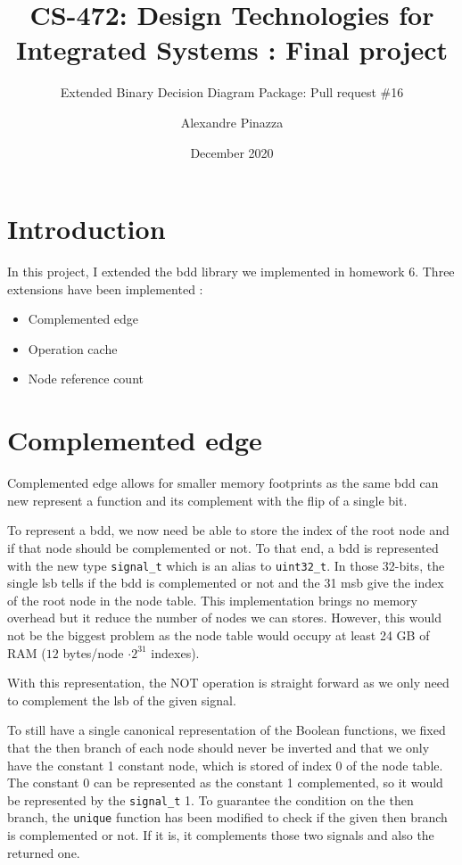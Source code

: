 \documentclass[nonacm=true]{acmart}
\title{CS-472: Design Technologies for Integrated Systems : Final project}
\subtitle{Extended Binary Decision Diagram Package: Pull request \#16}
\author{Alexandre Pinazza}
\affiliation{
    \institution{IC, EPFL}
    \state{Vaud}
    \city{Lausanne}
    \country{Switzerland}
}
\date{December 2020}
\newcommand{\inlineC}[1]{\texttt{#1}}
\begin{document}
\maketitle

\section{Introduction}
In this project, I extended the \acrfull{bdd} library we implemented in homework 6. Three extensions have been implemented :
\begin{itemize}
    \item Complemented edge
    \item Operation cache
    \item Node reference count
\end{itemize}

\section{Complemented edge}
Complemented edge allows for smaller memory footprints as the same \acrshort{bdd} can new represent a function and its complement with the flip of a single bit.

To represent a \acrshort{bdd}, we now need be able to store the index of the root node and if that node should be complemented or not. To that end, a \acrshort{bdd} is represented with the new type \inlineC{signal_t} which is an alias to \inlineC{uint32_t}. In those 32-bits, the single \acrfull{lsb} tells if the \acrshort{bdd} is complemented or not and the 31 \acrfull{msb} give the index of the root node in the node table. This implementation brings no memory overhead but it reduce the number of nodes we can stores. However, this would not be the biggest problem as the node table would occupy at least 24 GB of RAM ($12$ bytes/node $\cdot 2^{31}$ indexes).

With this representation, the NOT operation is straight forward as we only need to complement the \acrshort{lsb} of the given signal.

To still have a single canonical representation of the Boolean functions, we fixed that the then branch of each node should never be inverted and that we only have the constant 1 constant node, which is stored of index 0 of the node table. The constant 0 can be represented as the constant 1 complemented, so it would be represented by the \inlineC{signal_t} 1. To guarantee the condition on the then branch, the \inlineC{unique} function has been modified to check if the given then branch is complemented or not. If it is, it complements those two signals and also the returned one.
\end{document}
